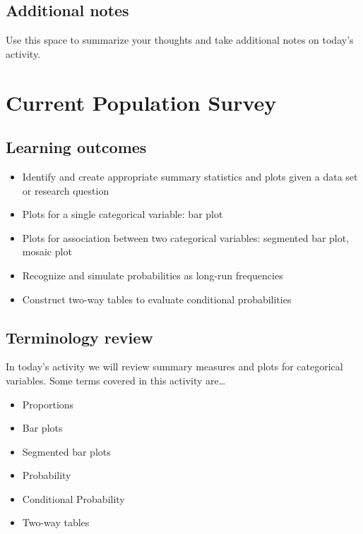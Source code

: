 \documentclass[
]{report}
\begin{document}
\hypertarget{additional-notes}{%
\section{Additional notes}\label{additional-notes}}

Use this space to summarize your thoughts and take additional notes on today's activity.

\hypertarget{current-population-survey}{%
\chapter{Current Population Survey}\label{current-population-survey}}

\hypertarget{learning-outcomes}{%
\section{Learning outcomes}\label{learning-outcomes}}

\begin{itemize}
\item
  Identify and create appropriate summary statistics and plots
  given a data set or research question
\item
  Plots for a single categorical variable: bar plot
\item
  Plots for association between two categorical variables:
  segmented bar plot, mosaic plot
\item
  Recognize and simulate probabilities as long-run frequencies
\item
  Construct two-way tables to evaluate conditional probabilities
\end{itemize}

\hypertarget{terminology-review}{%
\section{Terminology review}\label{terminology-review}}

In today's activity we will review summary measures and plots for categorical variables. Some terms covered in this activity are\ldots{}

\begin{itemize}
\item
  Proportions
\item
  Bar plots
\item
  Segmented bar plots
\item
  Probability
\item
  Conditional Probability
\item
  Two-way tables
\end{itemize}
\end{document}
